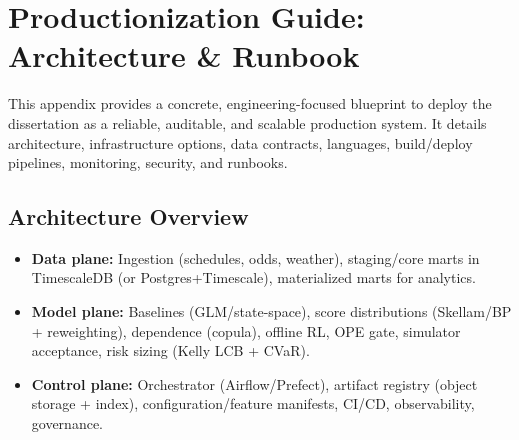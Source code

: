 \chapter{Productionization Guide: Architecture \& Runbook}
\label{app:prod-guide}

This appendix provides a concrete, engineering-focused blueprint to deploy the dissertation as a reliable, auditable, and scalable production system. It details architecture, infrastructure options, data contracts, languages, build/deploy pipelines, monitoring, security, and runbooks.

\section{Architecture Overview}
\begin{itemize}
  \item \textbf{Data plane:} Ingestion (schedules, odds, weather), staging/core marts in TimescaleDB (or Postgres+Timescale), materialized marts for analytics.
  \item \textbf{Model plane:} Baselines (GLM/state-space), score distributions (Skellam/BP + reweighting), dependence (copula), offline RL, OPE gate, simulator acceptance, risk sizing (Kelly LCB + CVaR).
  \item \textbf{Control plane:} Orchestrator (Airflow/Prefect), artifact registry (object storage + index), configuration/feature manifests, CI/CD, observability, governance.
\end{itemize}

